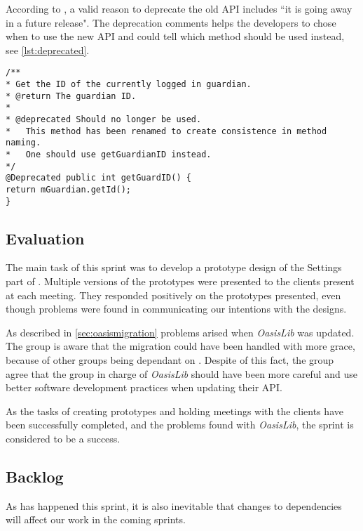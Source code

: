 According to \citet{deprecatedreference}, a valid reason to deprecate the old API includes ``it is going away in a future release". The deprecation comments helps the developers to chose when to use the new API and could tell which method should be used instead, see \cref{lst:deprecated}.

\begin{lstlisting}[caption={Example of a deprecated method could look like this.}, label={lst:deprecated}]
/**
* Get the ID of the currently logged in guardian.
* @return The guardian ID.
* 
* @deprecated Should no longer be used.
* 	This method has been renamed to create consistence in method naming.
*	One should use getGuardianID instead.
*/
@Deprecated public int getGuardID() {
return mGuardian.getId();
}
\end{lstlisting}

\subsection{Evaluation}
The main task of this sprint was to develop a prototype design of the Settings part of \launcher.
Multiple versions of the prototypes were presented to the clients present at each meeting.
They responded positively on the prototypes presented, even though problems were found in communicating our intentions with the designs.

As described in \cref{sec:oasismigration} problems arised when \textit{OasisLib} was updated.
The group is aware that the migration could have been handled with more grace, because of other groups being dependant on \launcher.
Despite of this fact, the group agree that the group in charge of \textit{OasisLib} should have been more careful and use better software development practices when updating their API.

As the tasks of creating prototypes and holding meetings with the clients have been successfully completed, and the problems found with \textit{OasisLib}, the sprint is considered to be a success.

\subsection{Backlog}\label{sec:sprint2:backlog}


As has happened this sprint, it is also inevitable that changes to dependencies will affect our work in the coming sprints.